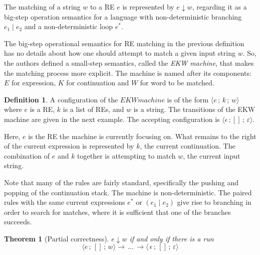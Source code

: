 \documentclass[oneside,12pt]{scrbook}
\newtheorem{Theorem}{Theorem}
\theoremstyle{definition}
\theoremstyle{plain}
\theoremstyle{definition}
\newtheorem{Definition}{Definition}
\begin{document}
The matching of a string $w$ to a RE $e$ is represented by $e \downarrow w$, regarding it as a big-step operation semantics for a language with non-deterministic branching $e_1 \mid e_2$ and a non-deterministic loop $e^*$.

The big-step operational semantics for RE matching in the previous definition has no details about how one should attempt to match a given input string $w$. So, the authors defined a small-step semantics, called the \textit{EKW machine}, that makes the matching process more explicit. The machine is named after its components: $E$ for expression, $K$ for continuation and $W$ for word to be matched.

\begin{Definition}
	A configuration of the $EKW machine$ is of the form $\langle e \, ; \, k \, ;\, w \rangle$ where $e$ is a RE, $k$ is a list of REs, and $w$ is a string. The transitions of the EKW machine are given in the next example. The accepting configuration is $\langle \epsilon \,; [ ] \,;\, \varepsilon \rangle$.
\end{Definition}

Here, $e$ is the RE the machine is currently focusing on. What remains to the right of the current expression is represented by $k$, the current continuation. The combination of $e$ and $k$ together is attempting to match $w$, the current input string.

Note that many of the rules are fairly standard, specifically the pushing and popping of the continuation stack. The machine is non-deterministic. The paired rules with the same current expressions $e^*$ or $(e_1 \mid e_2)$ give rise to branching in order to search for matches, where it is sufficient that one of the branches succeeds.

\begin{Theorem}[Partial correctness]
	$e \downarrow w$ if and only if there is a run
	\[\langle e \,;\, [ ]\, ;\, w \rangle \rightarrow \, ... \, \rightarrow \langle \, \epsilon \,;\, [ ]\, ;\, \varepsilon\rangle\]
\end{Theorem}
\end{document}
